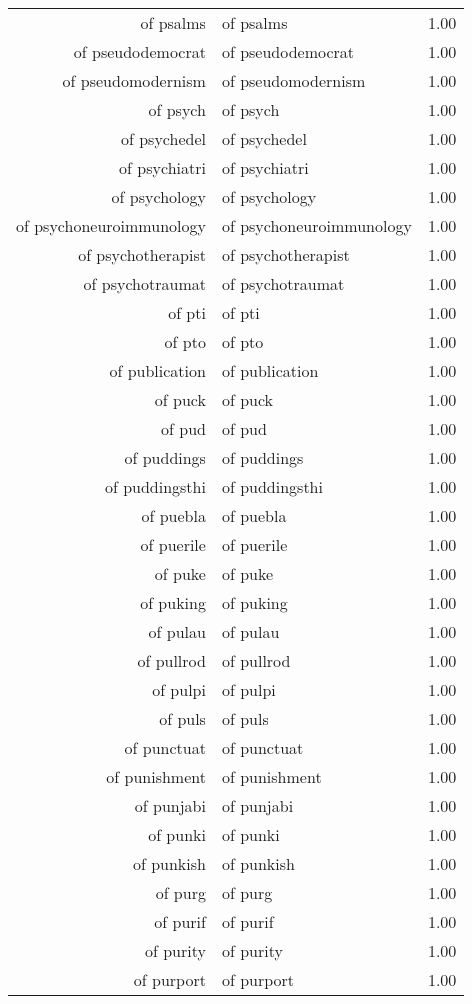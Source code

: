 \begin{table}[ht]
\begin{tabular}{rlr}
  of psalms & of psalms & 1.00 \\ 
  of pseudodemocrat & of pseudodemocrat & 1.00 \\ 
  of pseudomodernism & of pseudomodernism & 1.00 \\ 
  of psych & of psych & 1.00 \\ 
  of psychedel & of psychedel & 1.00 \\ 
  of psychiatri & of psychiatri & 1.00 \\ 
  of psychology & of psychology & 1.00 \\ 
  of psychoneuroimmunology & of psychoneuroimmunology & 1.00 \\ 
  of psychotherapist & of psychotherapist & 1.00 \\ 
  of psychotraumat & of psychotraumat & 1.00 \\ 
  of pti & of pti & 1.00 \\ 
  of pto & of pto & 1.00 \\ 
  of publication & of publication & 1.00 \\ 
  of puck & of puck & 1.00 \\ 
  of pud & of pud & 1.00 \\ 
  of puddings & of puddings & 1.00 \\ 
  of puddingsthi & of puddingsthi & 1.00 \\ 
  of puebla & of puebla & 1.00 \\ 
  of puerile & of puerile & 1.00 \\ 
  of puke & of puke & 1.00 \\ 
  of puking & of puking & 1.00 \\ 
  of pulau & of pulau & 1.00 \\ 
  of pullrod & of pullrod & 1.00 \\ 
  of pulpi & of pulpi & 1.00 \\ 
  of puls & of puls & 1.00 \\ 
  of punctuat & of punctuat & 1.00 \\ 
  of punishment & of punishment & 1.00 \\ 
  of punjabi & of punjabi & 1.00 \\ 
  of punki & of punki & 1.00 \\ 
  of punkish & of punkish & 1.00 \\ 
  of purg & of purg & 1.00 \\ 
  of purif & of purif & 1.00 \\ 
  of purity & of purity & 1.00 \\ 
  of purport & of purport & 1.00 \\ 

\end{tabular}
\end{table}
